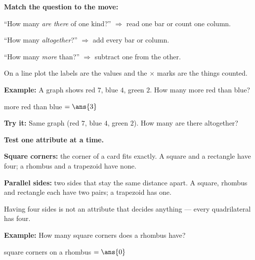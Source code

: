 \documentclass[12pt]{article}
\begin{document}


\begin{formulabox}
\textbf{Match the question to the move:}\par
``How many \emph{are there} of one kind?'' $\Rightarrow$ read one bar or count one column.\par
``How many \emph{altogether}?'' $\Rightarrow$ add every bar or column.\par
``How many \emph{more} than?'' $\Rightarrow$ subtract one from the other.\par
On a line plot the labels are the values and the $\times$ marks are the things counted.
\end{formulabox}

\begin{examplebox}
\textbf{Example:} \quad A graph shows red $7$, blue $4$, green $2$. How many more red than blue?

more red than blue $= \ans{3}$
\end{examplebox}

\begin{tryitbox}
\textbf{Try it:} \quad Same graph (red $7$, blue $4$, green $2$). How many are there altogether?\\[2pt]
\end{tryitbox}


\begin{formulabox}
\textbf{Test one attribute at a time.}\par
\textbf{Square corners:} the corner of a card fits exactly. A square and a rectangle have four; a
rhombus and a trapezoid have none.\par
\textbf{Parallel sides:} two sides that stay the same distance apart. A square, rhombus and rectangle
each have two pairs; a trapezoid has one.\par
Having four sides is not an attribute that decides anything --- every quadrilateral has four.
\end{formulabox}

\begin{examplebox}
\textbf{Example:} \quad How many square corners does a rhombus have?

square corners on a rhombus $= \ans{0}$
\end{examplebox}
\end{document}
